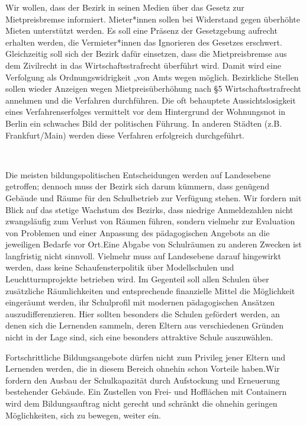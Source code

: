 \documentclass[a4paper,10pt]{article}
\newcommand{\mysection}[1]{{\vspace{1cm}\noindent\color{gray}{\ttfamily\LARGE\raggedright #1}\\\medskip}}
\newcommand{\bottomfigure}[1]{
\parbox{5cm}{
\vspace*{1cm}%
\texttt{[image: ./images/blog/small/\#1]}
}
}
\begin{document}
Wir wollen, dass der Bezirk in seinen Medien über das Gesetz zur
Mietpreisbremse informiert. Mieter*innen sollen bei Widerstand
gegen überhöhte Mieten unterstützt werden. Es soll eine Präsenz der
Gesetzgebung aufrecht erhalten werden, die Vermieter*innen das
Ignorieren des Gesetzes erschwert. Gleichzeitig soll sich der Bezirk
dafür einsetzen, dass die Mietpreisbremse aus dem Zivilrecht in das
Wirtschaftsstrafrecht überführt wird. Damit wird eine Verfolgung als
Ordnungswidrigkeit „von Amts wegen{\grqq} möglich. Bezirkliche Stellen sollen
wieder Anzeigen wegen Mietpreisüberhöhung nach §5 Wirtschaftsstrafrecht
annehmen und die Verfahren durchführen. Die oft behauptete
Aussichtslosigkeit eines Verfahrenserfolges vermittelt vor dem
Hintergrund der Wohnungsnot in Berlin ein schwaches Bild der politischen
Führung. In anderen Städten (z.B. Frankfurt/Main) werden diese Verfahren
erfolgreich durchgeführt.



\mysection{Schule}

Die meisten bildungspolitischen Entscheidungen werden auf Landesebene
getroffen; dennoch muss der Bezirk sich darum kümmern, dass genügend
Gebäude und Räume für den Schulbetrieb zur Verfügung stehen. Wir fordern
mit Blick auf das stetige Wachstum des Bezirks, dass niedrige
Anmeldezahlen nicht zwangsläufig zum Verlust von Räumen führen, sondern
vielmehr zur Evaluation von Problemen und einer Anpassung des
pädagogischen Angebots an die jeweiligen Bedarfe vor Ort.Eine Abgabe von
Schulräumen zu anderen Zwecken ist langfristig nicht sinnvoll. Vielmehr
muss auf Landesebene darauf hingewirkt werden, dass keine
Schaufensterpolitik über Modellschulen und Leuchtturmprojekte betrieben
wird. Im Gegenteil soll allen Schulen über zusätzliche Räumlichkeiten
und entsprechende finanzielle Mittel die Möglichkeit eingeräumt werden,
ihr Schulprofil mit modernen pädagogischen Ansätzen auszudifferenzieren.
Hier sollten besonders die Schulen gefördert werden, an denen sich die
Lernenden sammeln, deren Eltern aus verschiedenen Gründen nicht in der
Lage sind, sich eine besonders attraktive Schule auszuwählen.

\clearpage
Fortschrittliche Bildungsangebote dürfen nicht zum Privileg jener Eltern
und Lernenden werden, die in diesem Bereich ohnehin schon Vorteile
haben.Wir fordern den Ausbau der Schulkapazität durch Aufstockung und
Erneuerung bestehender Gebäude. Ein Zustellen von Frei- und Hofflächen
mit Containern wird dem Bildungsauftrag nicht gerecht und schränkt die
ohnehin geringen Möglichkeiten, sich zu bewegen, weiter ein.
\end{document}
